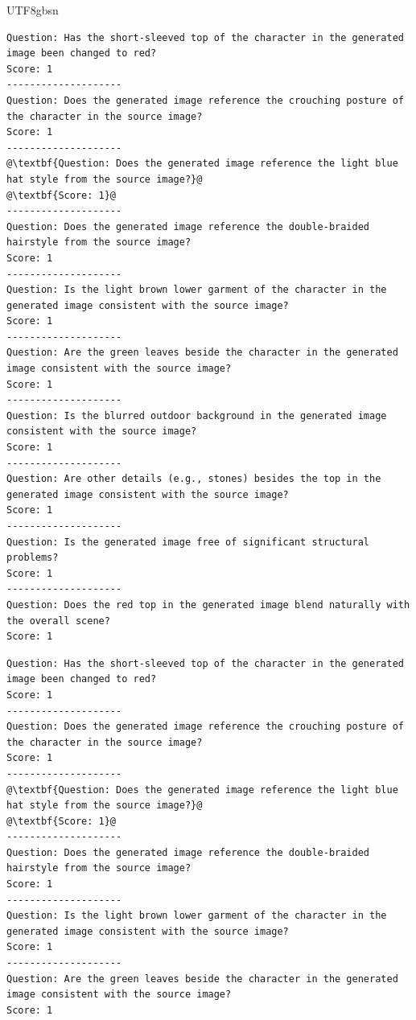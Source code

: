 \documentclass{llmxive}
\begin{document}
\begin{CJK*}{UTF8}{gbsn}
\begin{lstlisting}[style=promptstyle, caption={RRM verification for the SFT model's "loser" output. It correctly identifies the failure to preserve the hat style.}, label=lst:sft_loser_verification, escapechar=@]
Question: Has the short-sleeved top of the character in the generated image been changed to red?
Score: 1
--------------------
Question: Does the generated image reference the crouching posture of the character in the source image?
Score: 1
--------------------
@\textbf{Question: Does the generated image reference the light blue hat style from the source image?}@
@\textbf{Score: 1}@
--------------------
Question: Does the generated image reference the double-braided hairstyle from the source image?
Score: 1
--------------------
Question: Is the light brown lower garment of the character in the generated image consistent with the source image?
Score: 1
--------------------
Question: Are the green leaves beside the character in the generated image consistent with the source image?
Score: 1
--------------------
Question: Is the blurred outdoor background in the generated image consistent with the source image?
Score: 1
--------------------
Question: Are other details (e.g., stones) besides the top in the generated image consistent with the source image?
Score: 1
--------------------
Question: Is the generated image free of significant structural problems?
Score: 1
--------------------
Question: Does the red top in the generated image blend naturally with the overall scene?
Score: 1
\end{lstlisting}
\begin{lstlisting}[style=promptstyle, caption={RRM verification for the SFT model's "winner" output.}, label=lst:sft_winner_verification, escapechar=@]
Question: Has the short-sleeved top of the character in the generated image been changed to red?
Score: 1
--------------------
Question: Does the generated image reference the crouching posture of the character in the source image?
Score: 1
--------------------
@\textbf{Question: Does the generated image reference the light blue hat style from the source image?}@
@\textbf{Score: 1}@
--------------------
Question: Does the generated image reference the double-braided hairstyle from the source image?
Score: 1
--------------------
Question: Is the light brown lower garment of the character in the generated image consistent with the source image?
Score: 1
--------------------
Question: Are the green leaves beside the character in the generated image consistent with the source image?
Score: 1

\end{lstlisting}
\end{CJK*}
\end{document}
